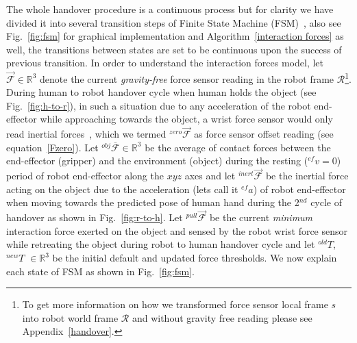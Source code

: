 \documentclass[a4paper, 12pt, oneside]{Thesis}  %
\begin{document}
The whole handover procedure is a continuous process but for clarity we have divided it into several transition steps of Finite State Machine (FSM)~\cite{wiki:fsm}, also see Fig.~\ref{fig:fsm} for graphical implementation and Algorithm~\ref{interaction forces} as well, the transitions between states are set to be continuous upon the success of previous transition. In order to understand the interaction forces model, let $\mathcal{\vec{F}}\in \mathbb{R}^3$ denote the current \textit{gravity-free} force sensor reading in the robot frame $\mathcal{R}$\footnote{\label{appendixC} To get more information on how we transformed force sensor local frame $s$ into robot world frame $\mathcal{R}$ and without gravity free reading please see Appendix~\ref{handover}.}. During human to robot handover cycle when human holds the object (see Fig.~\ref{fig:h-to-r}), in such a situation due to any acceleration of the robot end-effector while approaching towards the object, a wrist force sensor would only read inertial forces~\cite{spong2008robot}, which we termed ${}^{zero}\vec{\mathcal{F}}$ as force sensor offset reading (see equation~\ref{Fzero}). Let ${}^{obj}\overline{\mathcal{F}}\in \mathbb{R}^3$ be the average of contact forces between the end-effector (gripper) and the environment (object) during the resting (${}^{ef}v=0$) period of robot end-effector along the $xyz$ axes and let ${}^{inert}\vec{\mathcal{F}}$ be the inertial force acting on the object due to the acceleration (lets call it ${}^{ef}a$) of robot end-effector when moving towards the predicted pose of human hand during the 2$^{nd}$ cycle of handover as shown in Fig.~\ref{fig:r-to-h}. Let ${}^{pull}\vec{\mathcal{F}}$ be the current \textit{minimum} interaction force exerted on the object and sensed by the robot wrist force sensor while retreating the object during robot to human handover cycle and let ${}^{old}T$, ${}^{new}T$ $\in \mathbb{R}^3$ be the initial default and updated force thresholds. We now explain each state of FSM as shown in Fig.~\ref{fig:fsm}.
\end{document}
